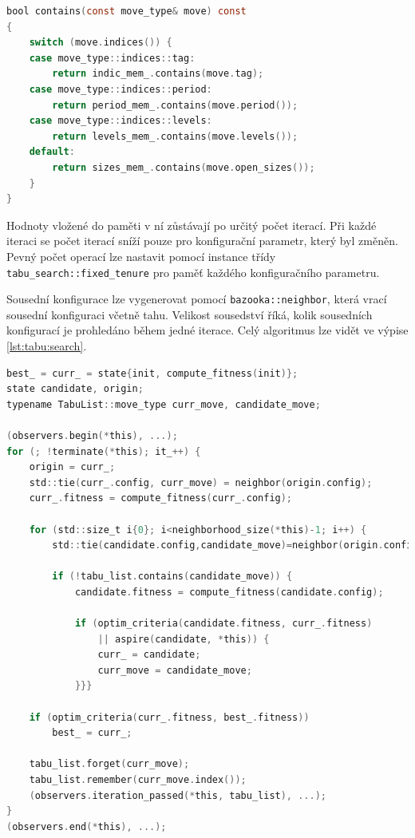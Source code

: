 \begin{lstlisting}[caption={~Použití třídy \texttt{bazooka::movement}},label={lst:movement:usage},captionpos=t,abovecaptionskip=-\medskipamount,belowcaptionskip=\medskipamount,language=C]
bool contains(const move_type& move) const
{
    switch (move.indices()) {
    case move_type::indices::tag:
        return indic_mem_.contains(move.tag);
    case move_type::indices::period:
        return period_mem_.contains(move.period());
    case move_type::indices::levels:
        return levels_mem_.contains(move.levels());
    default:
        return sizes_mem_.contains(move.open_sizes());
    }
}
\end{lstlisting}

Hodnoty vložené do paměti v ní zůstávají po určitý počet iterací.
Při každé iteraci se počet iterací sníží pouze pro konfigurační parametr, který byl změněn.
Pevný počet operací lze nastavit pomocí instance třídy \texttt{tabu\_search::fixed\_tenure} pro paměť každého konfiguračního parametru.

Sousední konfigurace lze vygenerovat pomocí \texttt{bazooka::neighbor}, která vrací sousední konfiguraci včetně tahu.
Velikost sousedství říká, kolik sousedních konfigurací je prohledáno během jedné iterace.
Celý algoritmus lze vidět ve výpise \ref{lst:tabu:search}.

\begin{lstlisting}[caption={~Implementace genetického algoritmu},label={lst:tabu:search},captionpos=t,abovecaptionskip=-\medskipamount,belowcaptionskip=\medskipamount,language=C]
best_ = curr_ = state{init, compute_fitness(init)};
state candidate, origin;
typename TabuList::move_type curr_move, candidate_move;

(observers.begin(*this), ...);
for (; !terminate(*this); it_++) {
    origin = curr_;
    std::tie(curr_.config, curr_move) = neighbor(origin.config);
    curr_.fitness = compute_fitness(curr_.config);

    for (std::size_t i{0}; i<neighborhood_size(*this)-1; i++) {
        std::tie(candidate.config,candidate_move)=neighbor(origin.config);

        if (!tabu_list.contains(candidate_move)) {
            candidate.fitness = compute_fitness(candidate.config);

            if (optim_criteria(candidate.fitness, curr_.fitness)
                || aspire(candidate, *this)) {
                curr_ = candidate;
                curr_move = candidate_move;
            }}}

    if (optim_criteria(curr_.fitness, best_.fitness))
        best_ = curr_;

    tabu_list.forget(curr_move);
    tabu_list.remember(curr_move.index());
    (observers.iteration_passed(*this, tabu_list), ...);
}
(observers.end(*this), ...);
\end{lstlisting}

